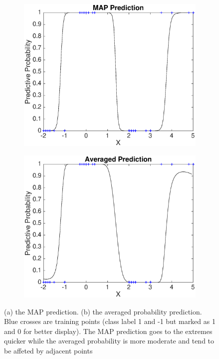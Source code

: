 \documentclass[14pt]{report}
\numberwithin{equation}{chapter}
\begin{document}
\begin{spacing}{2}
\begin{figure}
\begin{subfigure}{0.48\textwidth}
\centering
	\includegraphics[scale = 0.4]{classification_MAP.eps}
	\caption{}
\end{subfigure}
\hspace*{0.05\textwidth}
\begin{subfigure}{0.48\textwidth}
\centering
	\includegraphics[scale = 0.4]{classification_ave.eps}
	\caption{}
\end{subfigure}

\caption{(a) the MAP prediction. (b) the averaged probability prediction. Blue crosses are training points (class label 1 and -1 but marked as 1 and 0 for better display). The MAP prediction goes to the extremes quicker while the averaged probability is more moderate and tend to be affeted by adjacent points}



\end{figure}
\end{spacing}
\end{document}
